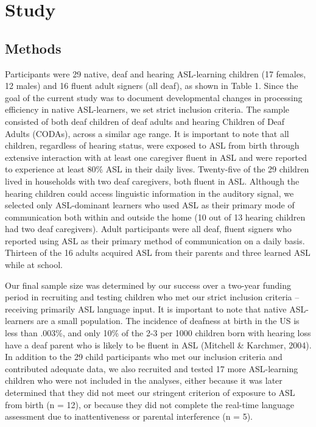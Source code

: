 \documentclass[oneside]{report}
\begin{document}
\section{Study}\label{study}

\subsection{Methods}\label{methods}

Participants were 29 native, deaf and hearing ASL-learning children (17
females, 12 males) and 16 fluent adult signers (all deaf), as shown in
Table 1. Since the goal of the current study was to document
developmental changes in processing efficiency in native ASL-learners,
we set strict inclusion criteria. The sample consisted of both deaf
children of deaf adults and hearing Children of Deaf Adults (CODAs),
across a similar age range. It is important to note that all children,
regardless of hearing status, were exposed to ASL from birth through
extensive interaction with at least one caregiver fluent in ASL and were
reported to experience at least 80\% ASL in their daily lives.
Twenty-five of the 29 children lived in households with two deaf
caregivers, both fluent in ASL. Although the hearing children could
access linguistic information in the auditory signal, we selected only
ASL-dominant learners who used ASL as their primary mode of
communication both within and outside the home (10 out of 13 hearing
children had two deaf caregivers). Adult participants were all deaf,
fluent signers who reported using ASL as their primary method of
communication on a daily basis. Thirteen of the 16 adults acquired ASL
from their parents and three learned ASL while at school.

Our final sample size was determined by our success over a two-year
funding period in recruiting and testing children who met our strict
inclusion criteria -- receiving primarily ASL language input. It is
important to note that native ASL-learners are a small population. The
incidence of deafness at birth in the US is less than .003\%, and only
10\% of the 2-3 per 1000 children born with hearing loss have a deaf
parent who is likely to be fluent in ASL (Mitchell \& Karchmer, 2004).
In addition to the 29 child participants who met our inclusion criteria
and contributed adequate data, we also recruited and tested 17 more
ASL-learning children who were not included in the analyses, either
because it was later determined that they did not meet our stringent
criterion of exposure to ASL from birth (n = 12), or because they did
not complete the real-time language assessment due to inattentiveness or
parental interference (n = 5).
\end{document}
